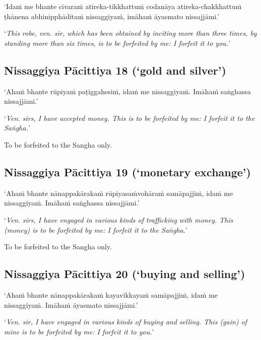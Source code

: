 ‘Idaṁ me bhante cīvaraṁ atireka-tikkhattuṁ codanāya atireka-chakkhattuṁ ṭhānena
abhinipphāditaṁ nissaggiyaṁ, imāhaṁ āyasmato nissajjāmi.’

‘\emph{This robe, ven. sir, which has been obtained by inciting more
  than three times, by standing more than six times, is to be forfeited by me: I
  forfeit it to you.}’ 


\subsection[NP 18 (‘gold and silver’)]{Nissaggiya Pācittiya 18 (‘gold and silver’)}

‘Ahaṁ bhante rūpiyaṁ paṭiggahesiṁ, idaṁ me nissaggiyaṁ. Imāhaṁ saṅghassa
nissajjāmi.’

‘\emph{Ven. sirs, I have accepted money. This is to be forfeited by me: I
  forfeit it to the Saṅgha.}’

To be forfeited to the Sangha only. 

\subsection[NP 19 (‘monetary exchange’)]{Nissaggiya Pācittiya 19 (‘monetary exchange’)}

‘Ahaṁ bhante nānappakārakaṁ rūpiyasaṁvohāraṁ samāpajjiṁ, idaṁ me nissaggiyaṁ.
Imāhaṁ saṅghassa nissajjāmi.’

‘\emph{Ven. sirs, I have engaged in various kinds of trafficking with money.
  This (money) is to be forfeited by me: I forfeit it to the Saṅgha.}’

To be forfeited to the Sangha only. 

\subsection[NP 20 (‘buying and selling’)]{Nissaggiya Pācittiya 20 (‘buying and selling’)}

‘Ahaṁ bhante nānappakārakaṁ kayavikkayaṁ samāpajjiṁ, idaṁ me nissaggiyaṁ. Imāhaṁ
āyasmato nissajjāmi.’

‘\emph{Ven. sir, I have engaged in various kinds of buying and selling. This
  (gain) of mine is to be forfeited by me: I forfeit it to you.}’ 

